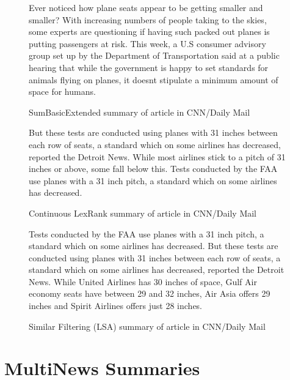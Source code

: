 \documentclass[../writeup.tex]{subfiles}
\begin{document}
\begin{figure}[H]
    \centering
    {\small Ever noticed how plane seats appear to be getting smaller and smaller? With increasing numbers of people taking to the skies, some experts are questioning if having such packed out planes is putting passengers at risk. This week, a U.S consumer advisory group set up by the Department of Transportation said at a public hearing that while the government is happy to set standards for animals flying on planes, it doesnt stipulate a minimum amount of space for humans.}
    \caption{SumBasicExtended summary of article in CNN/Daily Mail}
    \label{appendix:fig:summaries:sumbasic_cnn}
\end{figure}

\begin{figure}[H]
    \centering
    {\small But these tests are conducted using planes with 31 inches between each row of seats, a standard which on some airlines has decreased, reported the Detroit News. While most airlines stick to a pitch of 31 inches or above, some fall below this. Tests conducted by the FAA use planes with a 31 inch pitch, a standard which on some airlines has decreased.}
    \caption{Continuous LexRank summary of article in CNN/Daily Mail}
    \label{appendix:fig:summaries:lexrank_cnn}
\end{figure}

\begin{figure}[H]
    \centering
    {\small Tests conducted by the FAA use planes with a 31 inch pitch, a standard which on some airlines has decreased. But these tests are conducted using planes with 31 inches between each row of seats, a standard which on some airlines has decreased, reported the Detroit News. While United Airlines has 30 inches of space, Gulf Air economy seats have between 29 and 32 inches, Air Asia offers 29 inches and Spirit Airlines offers just 28 inches.}
    \caption{Similar Filtering (LSA) summary of article in CNN/Daily Mail}
    \label{appendix:fig:summaries:filter_cnn}
\end{figure}



\section{MultiNews Summaries}\label{summaries:sec:multi}
\end{document}
